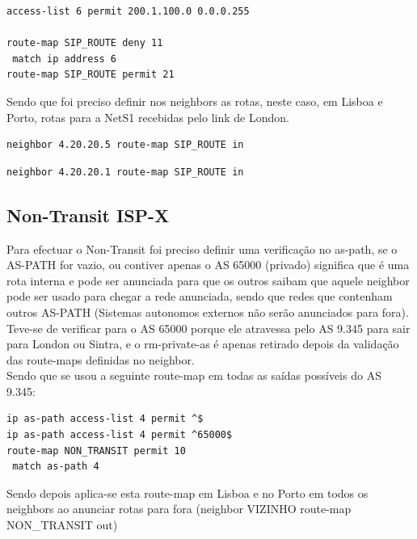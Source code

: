 \documentclass[11pt,a4paper]{report}
\begin{document}
\begin{lstlisting}[caption=Route-map SIP\_ROUTE para cancelar rotas]
access-list 6 permit 200.1.100.0 0.0.0.255

route-map SIP_ROUTE deny 11
 match ip address 6
route-map SIP_ROUTE permit 21
\end{lstlisting}

Sendo que foi preciso definir nos neighbors as rotas, neste caso, em Lisboa e Porto, rotas para a NetS1 recebidas pelo link de London.\\

\begin{lstlisting}[caption=Cancelar rota para NetS1 recebida em Lisboa por London]
neighbor 4.20.20.5 route-map SIP_ROUTE in
\end{lstlisting}

\begin{lstlisting}[caption=Cancelar rota para NetS1 recebida no Porto por London]
neighbor 4.20.20.1 route-map SIP_ROUTE in
\end{lstlisting}

\subsection{Non-Transit ISP-X}

Para efectuar o Non-Transit foi preciso definir uma verificação no as-path, se o AS-PATH for vazio, ou contiver apenas o AS 65000 (privado) significa que é uma rota interna e pode ser anunciada para que os outros saibam que aquele neighbor pode ser usado para chegar a rede anunciada, sendo que redes que contenham outros AS-PATH (Sistemas autonomos externos não serão anunciados para fora).\\

Teve-se de verificar para o AS 65000 porque ele atravessa pelo AS 9.345 para sair para London ou Sintra, e o rm-private-as é apenas retirado depois da validação das route-maps definidas no neighbor.\\

Sendo que se usou a seguinte route-map em todas as saídas possíveis do AS 9.345:

\begin{lstlisting}[caption=Tornar ISP X num AS Non-Transit]
ip as-path access-list 4 permit ^$
ip as-path access-list 4 permit ^65000$
route-map NON_TRANSIT permit 10
 match as-path 4
\end{lstlisting}

Sendo depois aplica-se esta route-map em Lisboa e no Porto em todos os neighbors ao anunciar rotas para fora (neighbor VIZINHO route-map NON\_TRANSIT out)
\end{document}
